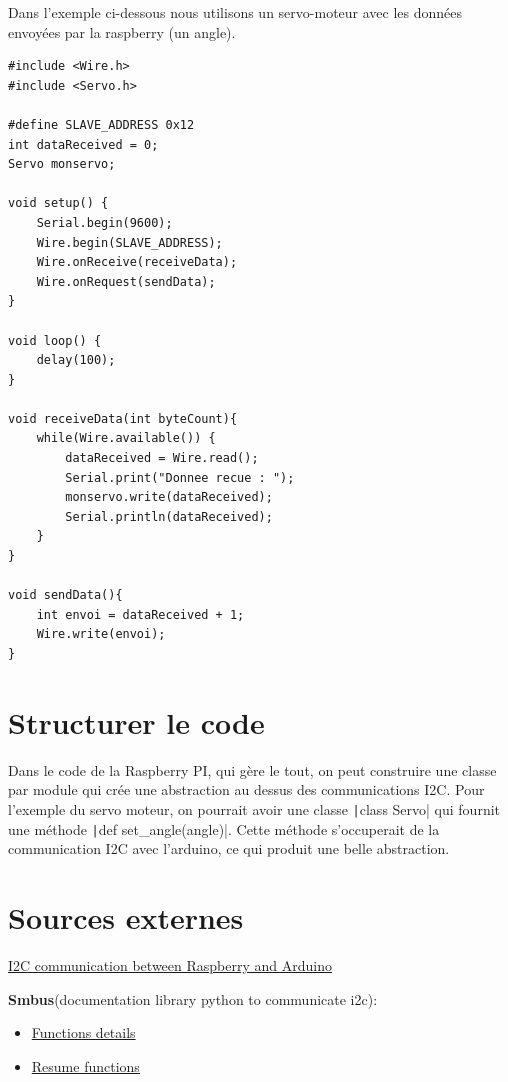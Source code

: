 \documentclass{eurobot_report}
\begin{document}
Dans l'exemple ci-dessous nous utilisons un servo-moteur avec les données envoyées par la raspberry (un angle).
\begin{verbatim}
#include <Wire.h>
#include <Servo.h>

#define SLAVE_ADDRESS 0x12
int dataReceived = 0;
Servo monservo;

void setup() {
    Serial.begin(9600);
    Wire.begin(SLAVE_ADDRESS);
    Wire.onReceive(receiveData);
    Wire.onRequest(sendData);
}

void loop() {
    delay(100);
}

void receiveData(int byteCount){
    while(Wire.available()) {
        dataReceived = Wire.read();
        Serial.print("Donnee recue : ");
        monservo.write(dataReceived);
        Serial.println(dataReceived);
    }
}

void sendData(){
    int envoi = dataReceived + 1;
    Wire.write(envoi);
}
\end{verbatim}


\section{Structurer le code}
Dans le code de la Raspberry PI, qui gère le tout, on peut construire une classe par module qui crée une abstraction au dessus des communications I2C. Pour l'exemple du servo moteur, on pourrait avoir une classe \texttt|class Servo| qui fournit une méthode \texttt|def set_angle(angle)|. Cette méthode s'occuperait de la communication I2C avec l'arduino, ce qui produit une belle abstraction.

\section{Sources externes}
\href{http://www.pihomeserver.fr/2013/08/13/raspberry-pi-home-server-arduino-lier-les-deux-via-bus-i2c/}{I2C communication between Raspberry and Arduino}

\textbf{Smbus}(documentation library python to communicate i2c):
\begin{itemize}
\item \href{https://www.mjmwired.net/kernel/Documentation/i2c/smbus-protocol}{Functions details}
\item \href{http://wiki.erazor-zone.de/wiki:linux:python:smbus:doc}{Resume functions}
\end{itemize}
\end{document}
